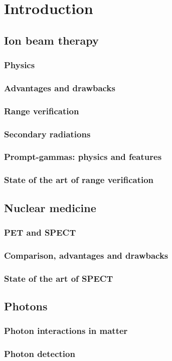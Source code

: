 \chapter{Introduction}

\section{Ion beam therapy}

\subsection{Physics}

\subsection{Advantages and drawbacks}

\subsection{Range verification}

\subsection{Secondary radiations}

\subsection{Prompt-gammas: physics and features}

\subsection{State of the art of range verification}


\section{Nuclear medicine}

\subsection{PET and SPECT}

\subsection{Comparison, advantages and drawbacks}

\subsection{State of the art of SPECT}


\section{Photons}

\subsection{Photon interactions in matter}

\subsection{Photon detection}


\clearpage
